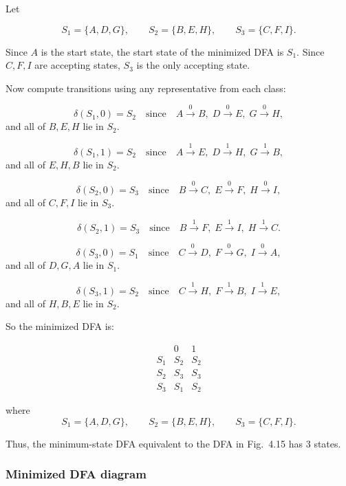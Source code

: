 \documentclass[11pt, a4paper]{article}
\theoremstyle{definition}
\theoremstyle{remark}
\begin{document}
Let

\[
S_1=\{A,D,G\}, \qquad
S_2=\{B,E,H\}, \qquad
S_3=\{C,F,I\}.
\]

Since \(A\) is the start state, the start state of the minimized DFA is \(S_1\).  
Since \(C,F,I\) are accepting states, \(S_3\) is the only accepting state.

Now compute transitions using any representative from each class:

\[
\delta(S_1,0)=S_2
\quad\text{since}\quad
A \xrightarrow{0} B,\;
D \xrightarrow{0} E,\;
G \xrightarrow{0} H,
\]
and all of \(B,E,H\) lie in \(S_2\).

\[
\delta(S_1,1)=S_2
\quad\text{since}\quad
A \xrightarrow{1} E,\;
D \xrightarrow{1} H,\;
G \xrightarrow{1} B,
\]
and all of \(E,H,B\) lie in \(S_2\).

\[
\delta(S_2,0)=S_3
\quad\text{since}\quad
B \xrightarrow{0} C,\;
E \xrightarrow{0} F,\;
H \xrightarrow{0} I,
\]
and all of \(C,F,I\) lie in \(S_3\).

\[
\delta(S_2,1)=S_3
\quad\text{since}\quad
B \xrightarrow{1} F,\;
E \xrightarrow{1} I,\;
H \xrightarrow{1} C.
\]

\[
\delta(S_3,0)=S_1
\quad\text{since}\quad
C \xrightarrow{0} D,\;
F \xrightarrow{0} G,\;
I \xrightarrow{0} A,
\]
and all of \(D,G,A\) lie in \(S_1\).

\[
\delta(S_3,1)=S_2
\quad\text{since}\quad
C \xrightarrow{1} H,\;
F \xrightarrow{1} B,\;
I \xrightarrow{1} E,
\]
and all of \(H,B,E\) lie in \(S_2\).

So the minimized DFA is:

\[
\begin{array}{c|cc}
   & 0 & 1 \\ \hline
S_1 & S_2 & S_2 \\
S_2 & S_3 & S_3 \\
S_3 & S_1 & S_2
\end{array}
\]

where
\[
S_1=\{A,D,G\},\qquad
S_2=\{B,E,H\},\qquad
S_3=\{C,F,I\}.
\]

Thus, the minimum-state DFA equivalent to the DFA in Fig.\ 4.15 has \(\boxed{3}\) states.

\subsubsection*{Minimized DFA diagram}

\begin{center}
\end{center}
\end{document}
